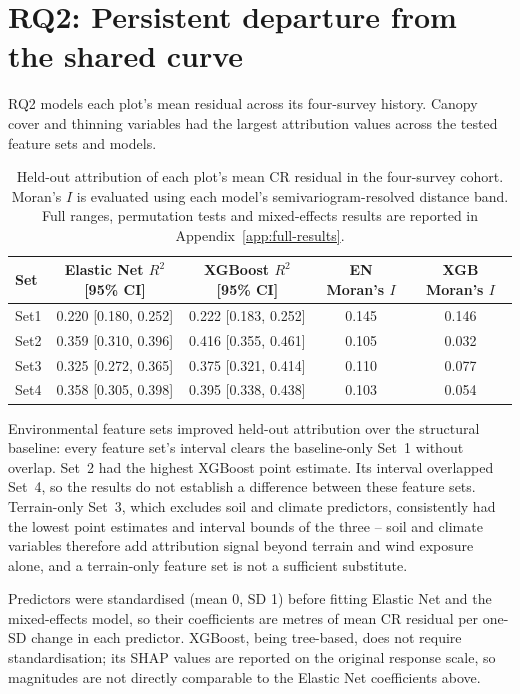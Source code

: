 \section{RQ2: Persistent departure from the shared curve}
\label{sec:results-rq2}

RQ2 models each plot's mean residual across its four-survey history. Canopy cover and thinning
variables had the largest attribution values across the tested feature sets and models.

\begin{table}[!htbp]
\centering
\scriptsize
\renewcommand{\arraystretch}{1.1}
\begin{tabular}{lcccc}
\toprule
Set & Elastic Net $R^2$ [95\% CI] & XGBoost $R^2$ [95\% CI]
& EN Moran's $I$ & XGB Moran's $I$ \\
\midrule
Set1 & 0.220 [0.180, 0.252] & 0.222 [0.183, 0.252] & 0.145 & 0.146 \\
Set2 & 0.359 [0.310, 0.396] & 0.416 [0.355, 0.461] & 0.105 & 0.032 \\
Set3 & 0.325 [0.272, 0.365] & 0.375 [0.321, 0.414] & 0.110 & 0.077 \\
Set4 & 0.358 [0.305, 0.398] & 0.395 [0.338, 0.438] & 0.103 & 0.054 \\
\bottomrule
\end{tabular}
\caption{Held-out attribution of each plot's mean CR residual in the four-survey cohort. Moran's
$I$ is evaluated using each model's semivariogram-resolved distance band. Full ranges, permutation
tests and mixed-effects results are reported in Appendix~\ref{app:full-results}.}
\label{tab:results-rq2}
\end{table}

Environmental feature sets improved held-out attribution over the structural baseline: every
feature set's interval clears the baseline-only Set~1 without overlap. Set~2 had the highest
XGBoost point estimate. Its interval overlapped Set~4, so the results do not establish a
difference between these feature sets. Terrain-only Set~3, which excludes soil and climate
predictors, consistently had the lowest point estimates and interval bounds of the three -- soil
and climate variables therefore add attribution signal beyond terrain and wind exposure alone, and
a terrain-only feature set is not a sufficient substitute.

Predictors were standardised (mean 0, SD 1) before fitting Elastic Net and the mixed-effects
model, so their coefficients are metres of mean CR residual per one-SD change in each predictor.
XGBoost, being tree-based, does not require standardisation; its SHAP values are reported on the
original response scale, so magnitudes are not directly comparable to the Elastic Net
coefficients above.

